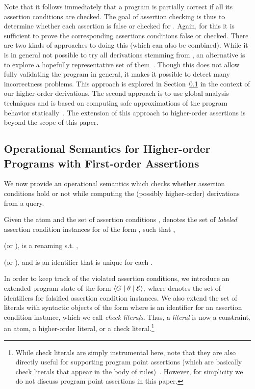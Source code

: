 \documentclass{llncs}
\newcommand{\gd}[0]{\mid}
\newcommand{\exstate}[3]
  {\ensuremath{\langle #1 \gd{} #2 \gd{} #3 \rangle}}
\newcommand{\ADeps}{\ensuremath{{\cal E}}}
\begin{document}
\noindent
Note that it follows immediately that a program is partially correct
if all its assertion conditions are checked.
The goal of assertion checking is thus to determine whether each
assertion  is false or checked for .  
Again, for this it is sufficient to prove the corresponding assertions
conditions false or checked.
There are two kinds of approaches to doing this (which can also be
combined). 
While it is in general not possible to try all derivations stemming
from , an alternative is to explore a hopefully representative set
of them~\cite{testchecks-iclp09}. Though this does not allow fully
validating the program in general, it makes it possible to detect many
incorrectness problems. This approach is explored in
Section~\ref{sec:Run-Time-Checking} in the context of our higher-order
derivations.
The second approach is to use global analysis techniques and is based
on computing safe approximations of the program behavior
statically~\cite{aadebug97-informal-short,ciaopp-sas03-journal-scp-short}. 
The extension of this approach to higher-order assertions is beyond
the scope of this paper.



\subsection{Operational Semantics for Higher-order Programs with
  First-order Assertions}
\label{sec:Run-Time-Checking}
We now provide an operational semantics which checks whether
assertion conditions hold or not while computing the (possibly
higher-order) derivations from a query.

\begin{definition}
  \label{def:assrt-cond-lab-inst}
  Given the atom  and the set of assertion conditions ,
   denotes the set of \emph{labeled} assertion condition
  instances for  of the form , such that
,

  (or ),
 is a renaming s.t. ,

  (or ),
and  is an identifier that is unique for each .
\end{definition}

In order to keep track of the violated assertion conditions, we
introduce an extended program state of the form
\exstate{G}{\theta}{\ADeps}, where  denotes the set of
identifiers for falsified assertion condition instances.
We also extend the set of literals with syntactic objects of the form
 where 
 is an identifier for an assertion condition instance,
which we call \emph{check literals}.
Thus, a \emph{literal} is now a constraint, an atom, a higher-order
literal, or a check literal.\footnote{While check literals are simply
  instrumental here, note that they are also directly useful for
  supporting program point assertions (which are basically check
  literals that appear in the body of
  rules)~\cite{assert-lang-disciplbook-short}. However, for simplicity
  we do not discuss program point assertions in this paper.}
\end{document}
